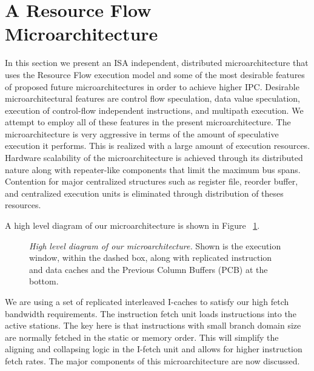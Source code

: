 \documentclass[10pt,twocolumn]{IEEEtran}
\begin{document}
\section {A Resource Flow Microarchitecture}
\label{sec:rfma}
%
In this section we present an ISA independent, distributed
microarchitecture that uses the Resource Flow execution model and some of
the most desirable features of proposed future microarchitectures in order to
achieve higher IPC.  
Desirable microarchitectural features are 
control flow speculation, data value speculation,
execution of control-flow independent instructions, and multipath execution.  
We attempt to employ all of these features in the present microarchitecture.
The microarchitecture is
very aggressive in terms of the amount of speculative execution it
performs.  
This is realized with a large amount of 
execution resources.  
Hardware scalability of the microarchitecture is
achieved through its distributed nature along with repeater-like
components that limit the maximum bus spans.  
Contention for major
centralized structures such as register file, reorder buffer, and
centralized execution units is eliminated through distribution of
theses resources.

A high level diagram of our microarchitecture is shown in
Figure ~\ref{fig:highlevel}.  
%
\begin{figure}
\caption{{\em High level diagram of our microarchitecture.}
Shown is the execution window, within the dashed box, along
with replicated instruction and data caches and the Previous
Column Buffers (PCB) at the bottom.}
\label{fig:highlevel}
\end{figure}
%
We are using a set of replicated
interleaved I-caches to satisfy our high fetch bandwidth requirements.
The instruction fetch unit loads instructions into the active
stations.  The key here is that instructions with small branch domain size
are normally fetched in the static or memory order.  This will simplify
the aligning and collapsing logic in the I-fetch unit and allows for
higher instruction fetch rates.
The major components of this microarchitecture are now discussed.
\end{document}
